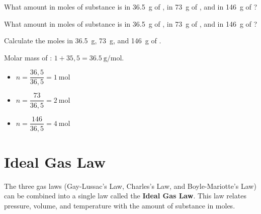 \begin{exercise}
    What amount in moles of substance is in \qty{36.5}{\g} of , in \qty{73}{\g} of , and in \qty{146}{\g} of ?
    \begin{solu}
        What amount in moles of substance is in \qty{36.5}{\g} of , in \qty{73}{\g} of , and in \qty{146}{\g} of ?

        Calculate the moles in \qty{36.5}{\g}, \qty{73}{\g}, and \qty{146}{\g} of .

        Molar mass of : \( 1 + 35{,}5 = \qty{36.5}{\g\per\mole} \).

        \begin{itemize}
            \item \( n = \dfrac{36{,}5}{36{,}5} = \qty{1}{\mole} \)
            \item \( n = \dfrac{73}{36{,}5} = \qty{2}{\mole} \)
            \item \( n = \dfrac{146}{36{,}5} = \qty{4}{\mole} \)
        \end{itemize}
    \end{solu}
\end{exercise}


\section{Ideal Gas Law}

The three gas laws (Gay-Lussac's Law, Charles's Law, and Boyle-Mariotte's Law) can be combined into a single law called the \textbf{Ideal Gas Law}. This law relates pressure, volume, and temperature with the amount of substance in moles.

